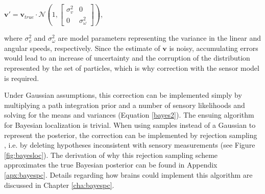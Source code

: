 $\bm v' = \bm v_{true} \cdot \mathcal{N}(1, \begin{bmatrix}\sigma_v^2 & 0\\ 0 & \sigma_\omega^2\end{bmatrix}) $,

where $ \sigma_v^2 $ and $ \sigma_\omega^2 $ are model parameters representing the variance in the linear and angular speeds, respectively. Since the estimate of $\bm v$ is noisy, accumulating errors would lead to an increase of uncertainty and the corruption of the distribution represented by the set of particles, which is why correction with the sensor model is required. 

Under Gaussian assumptions, this correction can be implemented simply by multiplying a path integration prior and a number of sensory likelihoods and solving for the means and variances (Equation \ref{bayes2}). The ensuing algorithm for Bayesian localization is trivial. When using samples instead of a Gaussian to represent the posterior, the correction can be implemented by rejection sampling \citep{doucet2000sequential}, i.e. by deleting hypotheses inconsistent with sensory measurements (see Figure \ref{fig:bayesloc}). The derivation of why this rejection sampling scheme approximates the true Bayesian posterior can be found in Appendix \ref{apx:bayespc}. Details regarding how brains could implement this algorithm are discussed in Chapter \ref{cha:bayespc}.

